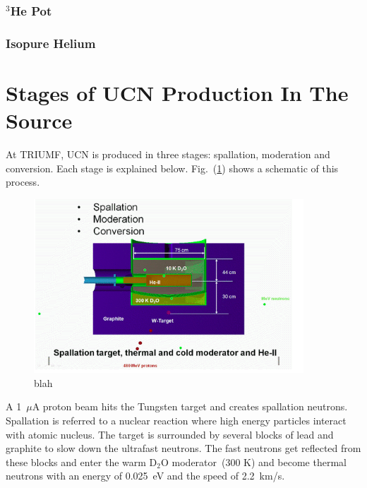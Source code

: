 \subsubsection{$^3$He Pot}

\subsubsection{Isopure Helium}


\section{Stages of UCN Production In The Source}
At TRIUMF, UCN is produced in three stages: spallation, moderation and
conversion. Each stage is explained
below. Fig.~(\ref{fig:ucn_production_stages}) shows a schematic of
this process.

\begin{figure}[h]
  \centering
  \includegraphics[width=0.9\textwidth]{ucn_production_stages.png}
  \caption{blah}
  \label{fig:ucn_production_stages}
\end{figure}

A 1~$\mu$A proton beam hits the Tungsten target and creates spallation
neutrons.  Spallation is referred to a nuclear reaction where high
energy particles interact with atomic nucleus.  The target is
surrounded by several blocks of lead and graphite to slow down the
ultrafast neutrons. The fast neutrons get reflected from these blocks and
enter the warm D$_2$O moderator~(300 K) and become thermal neutrons
with an energy of 0.025~eV and the speed of 2.2~km/s.

